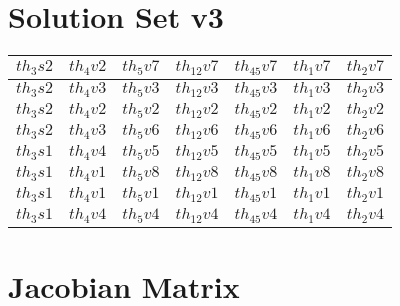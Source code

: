 \documentclass[letterpaper]{article}
\begin{document}
\section{Solution Set v3} \begin{tabular}{|l|l|l|l|l|l|l|}\hline
$th_3s2$ & $th_4v2$  & $th_5v7$  & $th_12v7$  & $th_45v7$  & $th_1v7$  & $th_2v7$ \\\hline
$th_3s2$ & $th_4v3$  & $th_5v3$  & $th_12v3$  & $th_45v3$  & $th_1v3$  & $th_2v3$ \\\hline
$th_3s2$ & $th_4v2$  & $th_5v2$  & $th_12v2$  & $th_45v2$  & $th_1v2$  & $th_2v2$ \\\hline
$th_3s2$ & $th_4v3$  & $th_5v6$  & $th_12v6$  & $th_45v6$  & $th_1v6$  & $th_2v6$ \\\hline
$th_3s1$ & $th_4v4$  & $th_5v5$  & $th_12v5$  & $th_45v5$  & $th_1v5$  & $th_2v5$ \\\hline
$th_3s1$ & $th_4v1$  & $th_5v8$  & $th_12v8$  & $th_45v8$  & $th_1v8$  & $th_2v8$ \\\hline
$th_3s1$ & $th_4v1$  & $th_5v1$  & $th_12v1$  & $th_45v1$  & $th_1v1$  & $th_2v1$ \\\hline
$th_3s1$ & $th_4v4$  & $th_5v4$  & $th_12v4$  & $th_45v4$  & $th_1v4$  & $th_2v4$ \\\hline
\end{tabular}



\newpage
\section{Jacobian Matrix}
\end{document}
